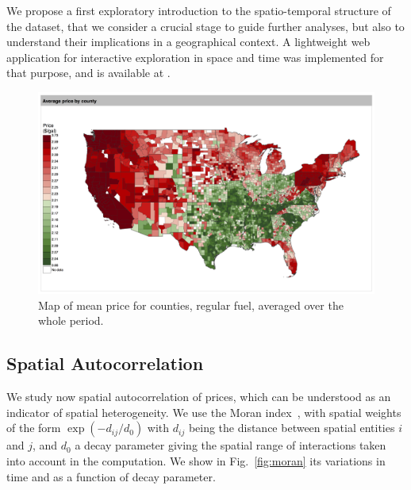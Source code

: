 \documentclass[3p,times,procedia]{elsarticle}
\begin{document}
We propose a first exploratory introduction to the spatio-temporal structure of the dataset, that we consider a crucial stage to guide further analyses, but also to understand their implications in a geographical context. A lightweight web application for interactive exploration in space and time was implemented for that purpose, and is available at \texttt{}.


\begin{figure}
\centering
\includegraphics[width=\textwidth]{figures/average_regular_map}
\caption{Map of mean price for counties, regular fuel, averaged over the whole period.}
\end{figure}


\subsection{Spatial Autocorrelation}


We study now spatial autocorrelation of prices, which can be understood as an indicator of spatial heterogeneity. We use the Moran index~\cite{tsai2005quantifying}, with spatial weights of the form $\exp{\left(-d_{ij} / d_0 \right)}$ with $d_{ij}$ being the distance between spatial entities $i$ and $j$, and $d_0$ a decay parameter giving the spatial range of interactions taken into account in the computation. We show in Fig.~\ref{fig:moran} its variations in time and as a function of decay parameter. 
\end{document}

